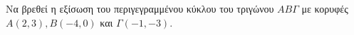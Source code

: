 Να βρεθεί η εξίσωση του περιγεγραμμένου κύκλου του τριγώνου $ AB\varGamma $ με κορυφές $ A(2,3),B(-4,0) $ και $ \varGamma(-1,-3) $.
